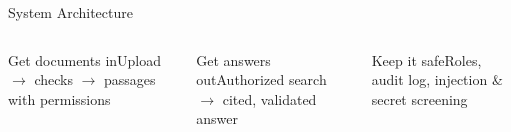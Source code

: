 \documentclass[aspectratio=169,11pt]{beamer}
\begin{document}
\begin{frame}{System Architecture}
  \vspace{0.5em}
  \begin{columns}[T]
      \begin{block}{Get documents in}\scriptsize Upload $\rightarrow$ checks $\rightarrow$ passages with permissions\end{block}
      \begin{block}{Get answers out}\scriptsize Authorized search $\rightarrow$ cited, validated answer\end{block}
      \begin{block}{Keep it safe}\scriptsize Roles, audit log, injection \& secret screening\end{block}
  \end{columns}
\end{frame}
\end{document}
